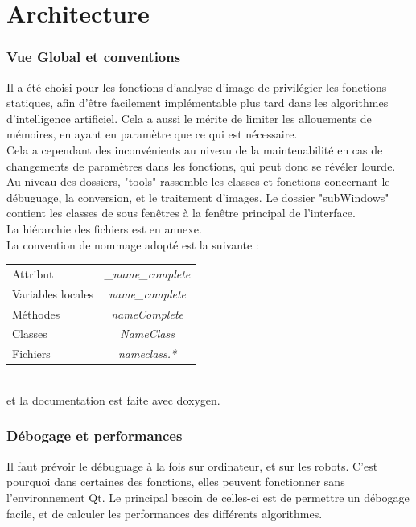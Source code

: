 \documentclass{article}
\begin{document}
\newpage
\part{Architecture}

\section{Vue Global et conventions}

Il a été choisi pour les fonctions d'analyse d'image de privilégier les fonctions statiques, afin d’être facilement implémentable plus tard dans les algorithmes d'intelligence artificiel. Cela a aussi le mérite de limiter les allouements de mémoires, en ayant en paramètre que ce qui est nécessaire.\\
Cela a cependant des inconvénients au niveau de la maintenabilité en cas de changements de paramètres dans les fonctions, qui peut donc se révéler lourde.\\

Au niveau des dossiers, "tools" rassemble les classes et fonctions concernant le débuguage, la conversion, et le traitement d'images.
Le dossier "subWindows" contient les classes de sous fenêtres à la fenêtre principal de l'interface.\\
La hiérarchie des fichiers est en annexe.\\

La convention de nommage adopté est la suivante :\\

\begin{tabular}{ l c }
   Attribut & \textit{\_name\_complete }\\
   Variables locales  & \textit{name\_complete}\\ 
   Méthodes & \textit{nameComplete}\\
   Classes 	& \textit{NameClass}\\
   Fichiers	& \textit{nameclass.*}\\
 \end{tabular}\\

et la documentation est faite avec doxygen.\\

\newpage
\section{Débogage et performances}

Il faut prévoir le débuguage à la fois sur ordinateur, et sur les robots. C'est pourquoi dans certaines des fonctions, elles peuvent fonctionner sans l'environnement Qt.
Le principal besoin de celles-ci est de permettre un débogage facile, et de calculer les performances des différents algorithmes.\\
\end{document}
